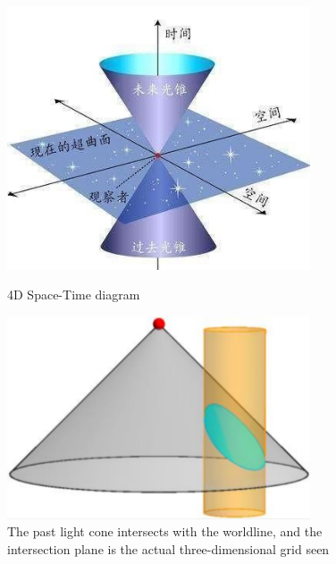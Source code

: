 \documentclass{article}
\begin{document}
\begin{figure}[htbp]
    \centering
    \setlength{\abovecaptionskip}{0.cm}
    \begin{minipage}[b]{0.5\linewidth}
        \centering
        \includegraphics[width=0.8\textwidth]{4DSpace.jpeg}
        \caption{4D Space-Time diagram}
        \label{4dspace}
    \end{minipage}
    \begin{minipage}[b]{0.4\linewidth}
        \centering
        \includegraphics[width=0.8\textwidth]{4Dintersect.jpg}
        \caption{The past light cone intersects with the worldline, and the intersection plane is the actual three-dimensional grid seen}
        \label{4dintersect}
    \end{minipage}
\end{figure}
\end{document}
